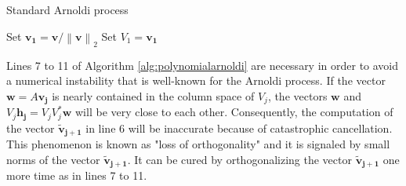 \begin{algorithm}[ht!]
    \caption{Standard Arnoldi process}
    \label{alg:polynomialarnoldi}
    Set $\mathbf{v_1} = \mathbf{v} / \left\| \mathbf{v} \right\|_2$\;
    Set $V_1 = \mathbf{v_1}$\;
\end{algorithm}

\begin{remark}
    Lines 7 to 11 of Algorithm \ref{alg:polynomialarnoldi} are necessary in order to avoid a
    numerical instability that is well-known for the Arnoldi process.
    If the vector $\mathbf{w} = A \mathbf{v_j}$ is nearly contained in the column
    space of $V_j$, the vectors $\mathbf{w}$ and $V_j \mathbf{h_j} = V_j V_j^* \mathbf{w}$
    will be very close to each other. Consequently, the computation of the vector
    $\mathbf{\tilde{v}_{j+1}}$ in line 6 will be inaccurate because of catastrophic
    cancellation.
    This phenomenon is known as "loss of orthogonality" and it is signaled by
    small norms of the vector $\mathbf{\tilde{v}_{j+1}}$. It can be cured by
    orthogonalizing the vector $\mathbf{\tilde{v}_{j+1}}$ one more time as in lines 7 to 11.
\end{remark}

